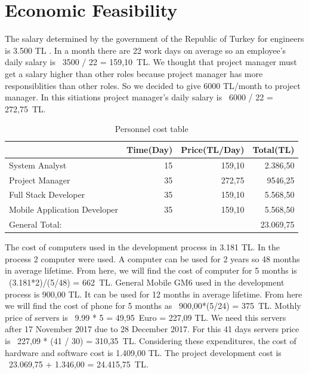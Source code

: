 \newpage
\section{Economic Feasibility}
The salary determined by the government of the Republic of Turkey for engineers
is 3.500 TL \cite{muhendisMaas}. In a month there are 22 work days on average so an employee's daily salary is \ 3500 / 22 = 159,10\ TL. We thought that project manager must get a salary higher than other roles because project manager has more responsiblities than other roles. So we decided to give 6000 TL/month to project manager. In this sitiations project manager's daily salary is \ 6000 / 22 = 272,75\ TL.

\begin{table}[!h!]
\centering
\caption{Personnel cost table}
\label{tab:maas}
\begin{tabular}{|l|r|r|r|}
\hline
& \multicolumn{1}{l|}{\textbf{Time(Day)}} & \multicolumn{1}{l|}{\textbf{Price(TL/Day)}} & \multicolumn{1}{l|}{\textbf{Total(TL)}} \\ \hline
System Analyst   & 15                                      & 159,10                                      & 2.386,50                                 \\ \hline
Project Manager      & 35                                      & 272,75                                      & 9546,25                                 \\ \hline
Full Stack Developer     & 35                                      & 159,10                                      & 5.568,50                                 \\ \hline
Mobile Application Developer & 35                                       & 159,10                                      & 5.568,50                                  \\ \hline
General Total:      & \multicolumn{3}{r|}{23.069,75}                                                                                                  \\ \hline
\end{tabular}
\end{table}

The cost of computers used in the development process in 3.181 TL\cite{dell}. In the process 2 computer were used. A computer can be used for 2 years so 48 months in average lifetime. From here, we will find the cost of computer for 5 months is  \ (3.181*2)/(5/48) = 662\ TL. General Mobile GM6 used in the development process is 900,00 TL\cite{gm6}. It can be used for 12 months in average lifetime. From here we will find the cost of phone for 5 months as \ 900,00*(5/24) = 375\ TL. Mothly price of servers is \ 9.99 * 5 = 49,95\ Euro = 227,09 TL. We need this servers after 17 November 2017 due to 28 December 2017. For this 41 days servers price is \ 227,09 * (41 / 30) = 310,35\ TL. Considering these expenditures, the cost of hardware and software cost is 1.409,00 TL. The project development cost is \ 23.069,75 + 1.346,00 = 24.415,75\ TL.


